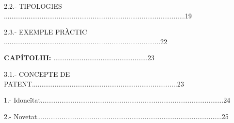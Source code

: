 \documentclass[12pt]{article}
\renewcommand{\_}{\kern-1.5pt\textunderscore\kern-1.5pt}
\begin{document}
\vspace{\baselineskip}
\begin{justify}
2.2.- TIPOLOGIES ................................................................................................19
\end{justify}\par


\vspace{\baselineskip}
\begin{justify}
2.3.- EXEMPLE PRÀCTIC ...................................................................................22
\end{justify}\par


\vspace{\baselineskip}

\vspace{\baselineskip}
\begin{justify}
\textbf{CAPÍTOLIII: }..................................................23
\end{justify}\par


\vspace{\baselineskip}

\vspace{\baselineskip}
\begin{justify}
3.1.- CONCEPTE DE PATENT.............................................................................23
\end{justify}\par


\vspace{\baselineskip}

\vspace{\baselineskip}
\begin{adjustwidth}{0.49in}{0.0in}
\begin{justify}
1.- Idoneïtat.................................................................................................24
\end{justify}\par

\end{adjustwidth}


\vspace{\baselineskip}
\begin{adjustwidth}{0.49in}{0.0in}
\begin{justify}
2.- Novetat..................................................................................................25
\end{justify}\par

\end{adjustwidth}
\end{document}
